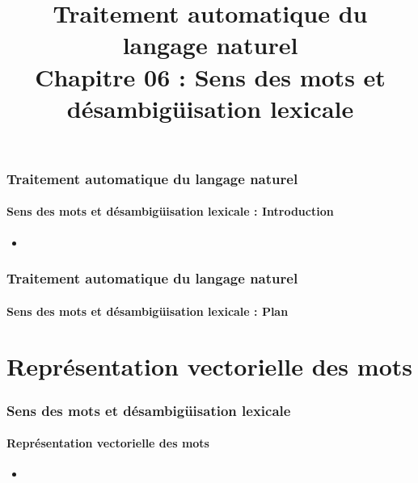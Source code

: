 \documentclass[xcolor=table]{beamer}
\title[TALN : 06- Sens et Désambigüisation]%
{Traitement automatique du langage naturel\\Chapitre 06 : Sens des mots et désambigüisation lexicale}
\begin{document}
	
\begin{frame}
\frametitle{Traitement automatique du langage naturel}
\framesubtitle{Sens des mots et désambigüisation lexicale : Introduction}

%		

\begin{itemize}
	\item 
\end{itemize}

\end{frame}

%
%

\begin{frame}
\frametitle{Traitement automatique du langage naturel}
\framesubtitle{Sens des mots et désambigüisation lexicale : Plan}

\begin{multicols}{2}
\tableofcontents
\end{multicols}
\end{frame}

\section{Représentation vectorielle des mots}

\begin{frame}
\frametitle{Sens des mots et désambigüisation lexicale}
\framesubtitle{Représentation vectorielle des mots}

\begin{itemize}
	\item 	
\end{itemize}

\end{frame}
\end{document}
